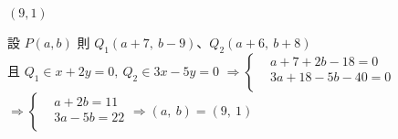 \begin{QUESTIONS}
\begin{QUESTION}
\begin{QBODY}
        \end{QBODY}
        \begin{QFROMS}
        \end{QFROMS}
        \begin{QTAGS}\end{QTAGS}
        \begin{QANS}
            $(9,1)$
        \end{QANS}
        \begin{QSOLLIST}
			\begin{QSOL}
				設 $P\left( a,b \right)$ 則 ${{Q}_{1}}\left( a+7,\ b-9 \right)$、${{Q}_{2}}\left( a+6,\ b+8 \right)$\\
				且 ${{Q}_{1}}\in x+2y=0,\ {{Q}_{2}}\in 3x-5y=0$
				$\Rightarrow \left\{ \begin{aligned}
				  & a+7+2b-18=0 \\ 
				 & 3a+18-5b-40=0 \\ 
				\end{aligned} \right.$$\Rightarrow \left\{ \begin{aligned}
				  & a+2b=11 \\ 
				 & 3a-5b=22 \\ 
				\end{aligned} \right.\Rightarrow \left( a,\ b \right)=\left( 9,\ 1 \right)$

			\end{QSOL}
        

\end{QSOLLIST}
\end{QUESTION}
\end{QUESTIONS}

